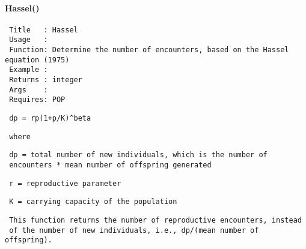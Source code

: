 \paragraph*{Hassel()\label{Hassel_}}
\begin{verbatim}
 Title   : Hassel
 Usage   :
 Function: Determine the number of encounters, based on the Hassel equation (1975)
 Example :
 Returns : integer
 Args    :
 Requires: POP
\end{verbatim}
\begin{verbatim}
 dp = rp(1+p/K)^beta
\end{verbatim}
\begin{verbatim}
 where
\end{verbatim}
\begin{verbatim}
 dp = total number of new individuals, which is the number of
 encounters * mean number of offspring generated
\end{verbatim}
\begin{verbatim}
 r = reproductive parameter
\end{verbatim}
\begin{verbatim}
 K = carrying capacity of the population
\end{verbatim}
\begin{verbatim}
 This function returns the number of reproductive encounters, instead
 of the number of new individuals, i.e., dp/(mean number of offspring).
\end{verbatim}
